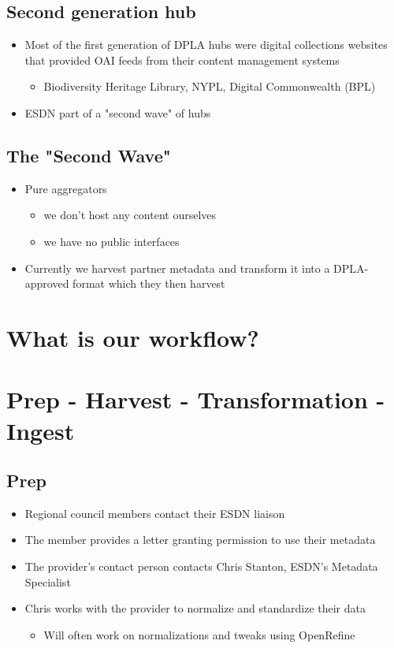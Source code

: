 \documentclass[11pt]{article}
\begin{document}
\subsection*{Second generation hub}
\label{sec:orgfe7e1d4}
\begin{itemize}
\item Most of the first generation of DPLA hubs were digital collections websites that provided OAI feeds from their content management systems
\begin{itemize}
\item Biodiversity Heritage Library, NYPL, Digital Commonwealth (BPL)
\end{itemize}
\item ESDN part of a "second wave" of hubs
\end{itemize}

\subsection*{The "Second Wave"}
\label{sec:orgca3b179}
\begin{itemize}
\item Pure aggregators
\begin{itemize}
\item we don't host any content ourselves
\item we have no public interfaces
\end{itemize}
\item Currently we harvest partner metadata and transform it into a DPLA-approved format which they then harvest
\end{itemize}

\section*{What is our workflow?}
\label{sec:org38f6761}
\section*{Prep - Harvest - Transformation - Ingest}
\label{sec:org7be12ad}
\subsection*{Prep}
\label{sec:orga9292e6}
\begin{itemize}
\item Regional council members contact their ESDN liaison
\item The member provides a letter granting permission to use their metadata
\item The provider's contact person contacts Chris Stanton, ESDN's Metadata Specialist
\item Chris works with the provider to normalize and standardize their data
\begin{itemize}
\item Will often work on normalizations and tweaks using OpenRefine
\end{itemize}
\end{itemize}
\end{document}
